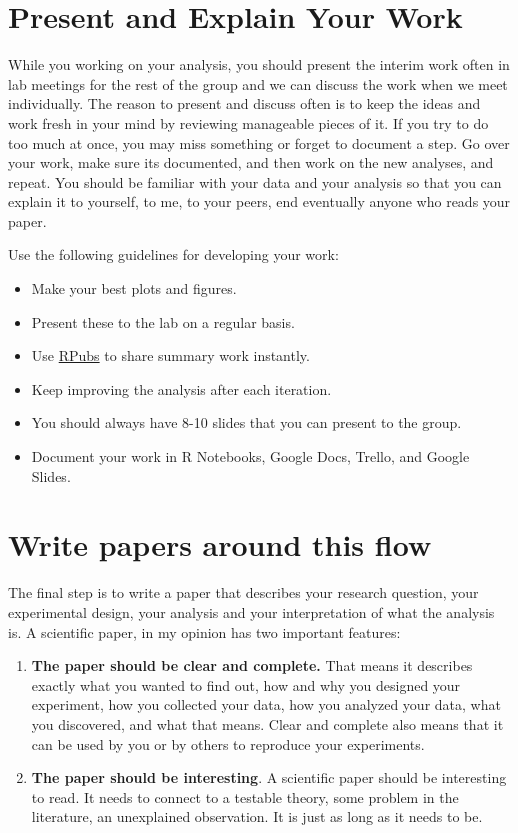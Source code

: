 \documentclass{article}
\begin{document}
\section{Present and Explain Your Work}
While you working on your analysis, you should present the interim work often in lab meetings for the rest of the group and we can discuss the work when we meet individually. The reason to present and discuss often is to keep the ideas and work fresh in your mind by reviewing manageable pieces of it. If you try to do too much at once, you may miss something or forget to document a step. Go over your work, make sure its documented, and then work on the new analyses, and repeat. You should be familiar with your data and your analysis so that you can explain it to yourself, to me, to your peers, end eventually anyone who reads your paper.

Use the following guidelines for developing your work:

\begin{itemize}
\item Make your best plots and figures.
\item Present these to the lab on a regular basis. 
\item Use \href{https://rpubs.com/}{RPubs} to share summary work instantly.
\item Keep improving the analysis after each iteration.
\item You should always have 8-10 slides that you can present to the group.
\item Document your work in R Notebooks, Google Docs, Trello, and Google Slides.
\end{itemize}

\section{Write papers around this flow}
The final step is to write a paper that describes your research question, your experimental design, your analysis and your interpretation of what the analysis is. A scientific paper, in my opinion has two important features: 

\begin{enumerate}
    \item \textbf{The paper should be clear and complete.} That means it describes exactly what you wanted to find out, how and why you designed your experiment, how you collected your data, how you analyzed your data, what you discovered, and what that means.  Clear and complete also means that it can be used by you or by others to reproduce your experiments.
    \item \textbf{The paper should be interesting}. A scientific paper should be interesting to read. It needs to connect to a testable theory, some problem in the literature, an unexplained observation. It is just as long as it needs to be. 
\end{enumerate}
\end{document}
